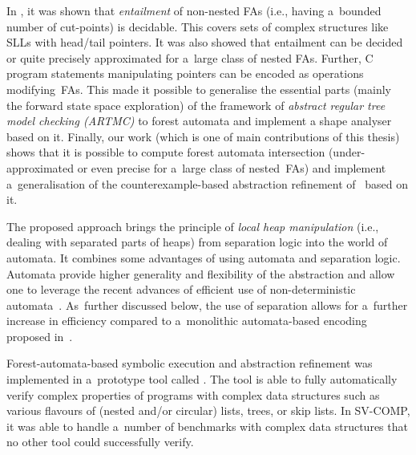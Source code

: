 In \cite{forester11}, it was shown that \emph{entailment} of non-nested FAs
(i.e., having a~bounded number of cut-points) is decidable. This covers  sets of
complex structures like SLLs with head/tail pointers. 
It was also showed that entailment can be decided or quite precisely approximated for a~large class
of nested FAs. 
Further, C program statements manipulating pointers can be encoded as operations
modifying~FAs. 
%
This made it possible to generalise the essential parts (mainly the forward state space exploration) of the framework of 
\emph{abstract regular tree model checking (ARTMC)} \cite{bhrv06a,bhrv06b} to forest automata and implement a shape analyser based on it. 
%
Finally, our work \cite{vmcai17} (which is one of main contributions of this thesis) shows that it is possible to compute forest
automata intersection (under-approximated or even precise for a~large class
of nested~FAs) and implement a~generalisation of the
counterexample-based abstraction refinement of~\cite{bhrv06a,bhrv06b} based on it. 


The proposed approach brings the principle of \emph{local heap manipulation}
(i.e., dealing with separated parts of heaps) from separation logic into the
world of automata. It combines some advantages of using
automata and separation logic. Automata provide higher generality and
flexibility of the abstraction 
and allow one to leverage the
recent advances of efficient use of non-deterministic
automata~\cite{abdulla_computing_2008,tacas10}.
As~further discussed below, the use of
separation allows for a~further increase in efficiency compared to a~monolithic
automata-based encoding proposed in~\cite{bhrv06b}.

Forest-automata-based symbolic execution and abstraction refinement was implemented in a~prototype tool called \forester.
The tool is able to fully automatically verify complex properties of programs with complex data structures
such as various flavours of (nested and/or circular) lists, trees, or skip lists.
In SV-COMP, it was able to handle a~number of benchmarks with complex data
structures that no other tool could successfully verify. 


